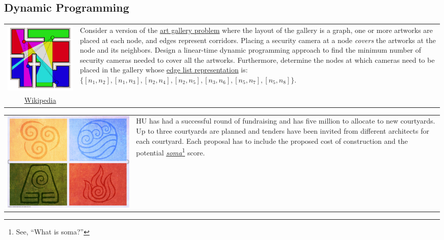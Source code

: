 \documentclass[addpoints]{exam}
\begin{document}
\begin{questions}
  \section*{Dynamic Programming}
\question
  \begin{tabularx}{\textwidth}{cX}
    \includegraphics[width=.2\textwidth,align=t]{gallery}
    &
    Consider a version of the \href{https://en.wikipedia.org/wiki/Art_gallery_problem}{art gallery problem} where the layout of the gallery is a graph, one or more artworks are placed at each node, and edges represent corridors. Placing a security camera at a node \textit{covers} the artworks at the node and its neighbors. Design a linear-time dynamic programming approach to find the minimum number of security cameras needed to cover all the artworks. Furthermore, determine the nodes at which cameras need to be placed in the gallery whose \href{https://rpruim.github.io/m252/S19/from-class/graphs/graph-representations.html}{edge list representation} is: $\{[n_1,n_2], [n_1, n_3], [n_2,n_4], [n_2, n_5],[n_3,n_6], [n_5, n_7],[n_5,n_8]\}$.\\
    \href{https://en.wikipedia.org/wiki/Art_gallery_problem}{Wikipedia}
  \end{tabularx}
  
  \begin{solution}
    
  \end{solution}

\question
  \begin{tabularx}{\textwidth}{cX}
    \includegraphics[scale=.15,align=t]{elements}
    &
    HU has had a successful round of fundraising and has five million to allocate to new courtyards. Up to three courtyards are planned and tenders have been invited from different architects for each courtyard. Each proposal has to include the proposed cost of construction and the potential \href{https://www.sparknotes.com/lit/bravenew/key-questions-and-answers/}{\textit{soma}}\footnote{See, ``What is soma?''} score.


\end{tabularx}
\end{questions}
\end{document}
